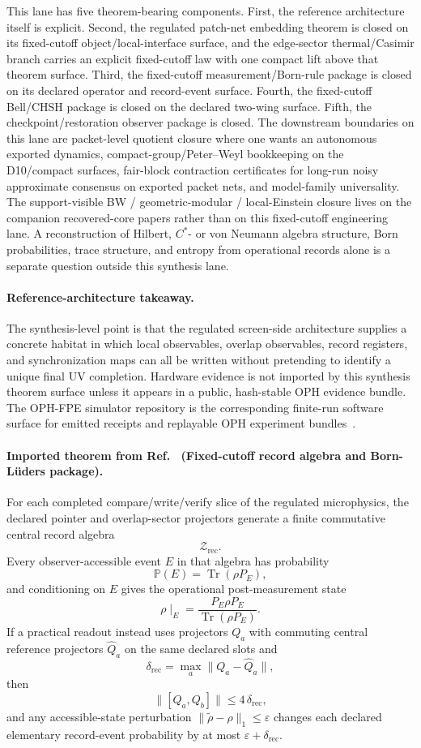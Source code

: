 This lane has five theorem-bearing components. First, the reference architecture itself is
explicit. Second, the regulated patch-net embedding theorem is closed on its fixed-cutoff
object/local-interface surface, and the edge-sector thermal/Casimir branch carries an explicit
fixed-cutoff law with one compact lift above that theorem surface.
Third, the fixed-cutoff measurement/Born-rule package is closed on its declared operator and
record-event surface. Fourth, the fixed-cutoff
Bell/CHSH package is closed on the declared two-wing surface. Fifth, the
checkpoint/restoration observer package is closed. The downstream boundaries on this lane are
packet-level quotient closure where one wants an autonomous exported dynamics,
compact-group/Peter--Weyl bookkeeping on the D10/compact surfaces, fair-block contraction
certificates for long-run noisy approximate consensus on exported packet nets, and model-family
universality. The
support-visible BW / geometric-modular / local-Einstein closure lives on the companion recovered-core
papers rather than on this fixed-cutoff engineering lane. A reconstruction of Hilbert, \(C^*\)- or von Neumann algebra
structure, Born probabilities, trace structure, and entropy from operational records alone is
a separate question outside this synthesis lane.

\paragraph{Reference-architecture takeaway.}
The synthesis-level point is that the regulated screen-side architecture supplies a concrete
habitat in which local observables, overlap observables, record registers, and synchronization
maps can all be written without pretending to identify a unique final UV completion. Hardware
evidence is not imported by this synthesis theorem surface unless it appears in a public,
hash-stable OPH evidence bundle. The OPH-FPE simulator repository is the corresponding finite-run
software surface for emitted receipts and replayable OPH experiment bundles~\cite{ophfpe}.

\paragraph{Imported theorem from Ref.~\cite{ophmicrophysics} (Fixed-cutoff record algebra and Born-L\"uders package).}
For each completed compare/write/verify slice of the regulated microphysics, the declared pointer
and overlap-sector projectors generate a finite commutative central record algebra
\[
\mathcal Z_{\mathrm{rec}}.
\]
Every observer-accessible event \(E\) in that algebra has probability
\[
\mathbb P(E)=\operatorname{Tr}(\rho P_E),
\]
and conditioning on \(E\) gives the operational post-measurement state
\[
\rho\!\mid_E = \frac{P_E \rho P_E}{\operatorname{Tr}(\rho P_E)}.
\]
If a practical readout instead uses projectors \(Q_a\) with commuting central reference
projectors \(\widehat Q_a\) on the same declared slots and
\[
\delta_{\mathrm{rec}}=\max_a \|Q_a-\widehat Q_a\|,
\]
then
\[
\|[Q_a,Q_b]\|\le 4\,\delta_{\mathrm{rec}},
\]
and any accessible-state perturbation \(\|\widetilde\rho-\rho\|_1\le\varepsilon\) changes each
declared elementary record-event probability by at most \(\varepsilon+\delta_{\mathrm{rec}}\).

